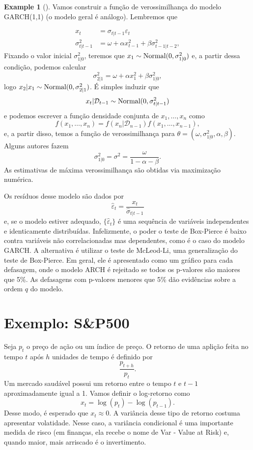 \documentclass[
  letterpaper,
  DIV=11,
  numbers=noendperiod]{scrartcl}
\theoremstyle{definition}
\newtheorem{example}{Example}[chapter]
\theoremstyle{definition}
\theoremstyle{plain}
\theoremstyle{plain}
\theoremstyle{remark}
\begin{document}
\begin{example}[]
Vamos construir a função de verossimilhança do modelo GARCH(1,1) (o
modelo geral é análogo). Lembremos que

\begin{align}x_t&=\sigma_{t|t-1}\varepsilon_t\\ \sigma^2_{t|t-1}&=\omega+\alpha x_{t-1}^2+\beta\sigma^2_{t-1|t-2},\end{align}
Fixando o valor inicial \(\sigma^2_{1|0}\), teremos que
\(x_1\sim\hbox{Normal}(0, \sigma^2_{1|0})\) e, a partir dessa condição,
podemos calcular
\[\sigma^2_{2|1}=\omega+\alpha x_1^2 + \beta \sigma^2_{1|0},\] logo
\(x_2|x_1\sim\hbox{Normal}(0, \sigma^2_{2|1})\). É simples induzir que
\[x_t|\mathcal{D}_{t-1}\sim\hbox{Normal}(0,\sigma^2_{t|t-1})\] e podemos
escrever a função densidade conjunta de \(x_1,\ldots,x_n\) como
\[f(x_1,\ldots,x_n)=f(x_n|\mathcal{D}_{n-1})f(x_1,\ldots,x_{n-1}),\] e,
a partir disso, temos a função de verossimilhança para
\(\theta=(\omega, \sigma_{1|0}^2, \alpha,\beta)\). Alguns autores fazem
\[\sigma^2_{1|0}=\sigma^2=\frac{\omega}{1-\alpha-\beta}.\] As
estimativas de máxima verossimilhança são obtidas via maximização
numérica.

Os resíduos desse modelo são dados por
\[\hat{\varepsilon}_t=\frac{x_t}{\hat{\sigma}_{t|t-1}}\] e, se o modelo
estiver adequado, \(\{\hat{\varepsilon}_t\}\) é uma sequência de
variáveis independentes e identicamente distribuídas. Infelizmente, o
poder o teste de Box-Pierce é baixo contra variáveis não correlacionadas
mas dependentes, como é o caso do modelo GARCH. A alternativa é utilizar
o teste de McLeod-Li, uma generalização do teste de Box-Pierce. Em
geral, ele é apresentado como um gráfico para cada defasagem, onde o
modelo ARCH é rejeitado se todos os p-valores são maiores que 5\%. As
defasagens com p-valores menores que 5\% dão evidências sobre a ordem
\(q\) do modelo.

\section{Exemplo: S\&P500}\label{exemplo-sp500}

Seja \(p_t\) o preço de ação ou um índice de preço. O retorno de uma
aplição feita no tempo \(t\) após \(h\) unidades de tempo é definido por
\[\frac{p_{t+h}}{p_t}.\] Um mercado saudável possui um retorno entre o
tempo \(t\) e \(t-1\) aproximadamente igual a 1. Vamos definir o
log-retorno como \[x_t=\log(p_t)-\log(p_{t-1}).\] Desse modo, é esperado
que \(x_t\approx 0\). A variância desse tipo de retorno costuma
apresentar volatidade. Nesse caso, a variância condicional é uma
importante medida de risco (em finanças, ela recebe o nome de Var -
Value at Risk) e, quando maior, mais arriscado é o invertimento.


\end{example}
\end{document}

